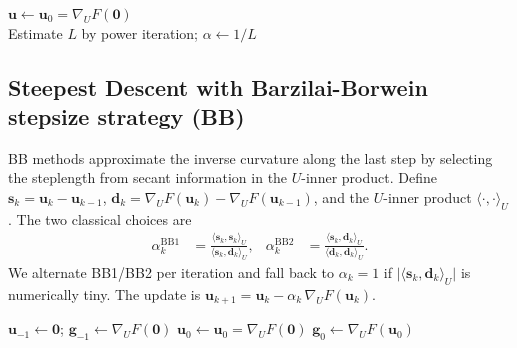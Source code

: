 \documentclass[11pt,a4paper]{article}
\begin{document}
\begin{algorithm}
\caption{Steepest Descent with constant stepsize $\alpha=1/L$}\label{alg:gd}
$\mathbf{u} \gets \mathbf{u}_0=\nabla_U F(\mathbf{0})$\\
Estimate $L$ by power iteration; $\alpha \gets 1/L$\;
\end{algorithm}

\subsection{Steepest Descent with Barzilai-Borwein stepsize strategy (BB)}
BB methods approximate the inverse curvature along the last step by selecting the steplength from secant information in the \(U\)-inner product. Define \(\mathbf{s}_k=\mathbf{u}_k-\mathbf{u}_{k-1}\), \(\mathbf{d}_k=\nabla_U F(\mathbf{u}_k)-\nabla_U F(\mathbf{u}_{k-1})\), and the \(U\)-inner product \(\langle \cdot, \cdot \rangle_U\). The two classical choices are
\begin{align}
  \alpha_k^{\text{BB1}} &= \frac{\langle \mathbf{s}_k, \mathbf{s}_k \rangle_U}{\langle \mathbf{s}_k, \mathbf{d}_k \rangle_U}, &
  \alpha_k^{\text{BB2}} &= \frac{\langle \mathbf{s}_k, \mathbf{d}_k \rangle_U}{\langle \mathbf{d}_k, \mathbf{d}_k \rangle_U}.
\end{align}
We alternate BB1/BB2 per iteration and fall back to \(\alpha_k=1\) if \(\big|\langle \mathbf{s}_k, \mathbf{d}_k \rangle_U\big|\) is numerically tiny. The update is
\(\mathbf{u}_{k+1} = \mathbf{u}_k - \alpha_k\, \nabla_U F(\mathbf{u}_k)\).

\begin{algorithm}
\caption{Steepest Descent with Barzilai-Borwein stepsize strategy}\label{alg:bb}
$\mathbf{u}_{-1} \gets \mathbf{0}$; $\mathbf{g}_{-1} \gets \nabla_U F(\mathbf{0})$\;
$\mathbf{u}_0 \gets \mathbf{u}_0=\nabla_U F(\mathbf{0})$\; $\mathbf{g}_0 \gets \nabla_U F(\mathbf{u}_0)$\\
\end{algorithm}
\end{document}
